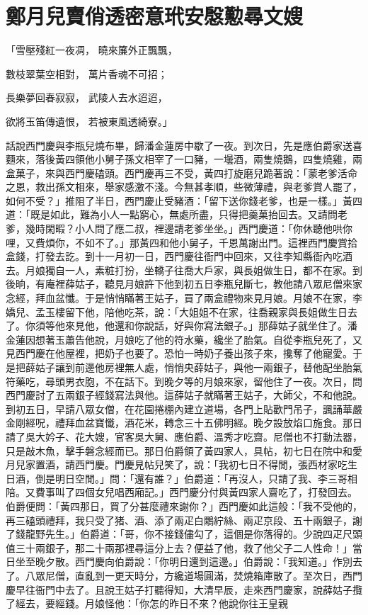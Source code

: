 %

\chapter{鄭月兒賣俏透密意\KG 玳安慇懃尋文嫂}


「雪壓殘紅一夜凋，  曉來簾外正飄飄，

數枝翠葉空相對，  萬片香魂不可招；

長樂夢回春寂寂，  武陵人去水迢迢，

欲將玉笛傳遺恨，  若被東風透綺寮。」

話說西門慶與李瓶兒燒布畢，歸潘金蓮房中歇了一夜。到次日，先是應伯爵家送喜麵來，落後黃四領他小舅子孫文相宰了一口豬，一壜酒，兩隻燒鵝，四隻燒雞，兩盒菓子，來與西門慶磕頭。西門慶再三不受，黃四打旋磨兒跪著說：「蒙老爹活命之恩，救出孫文相來，舉家感激不淺。今無甚孝順，些微薄禮，與老爹賞人罷了，如何不受？」推阻了半日，西門慶止受豬酒：「留下送你錢老爹，也是一樣。」黃四道：「既是如此，難為小人一點窮心，無處所盡，只得把羹菓抬回去。又請問老爹，幾時閑暇？小人問了應二叔，裡邊請老爹坐坐。」西門慶道：「你休聽他哄你哩，又費煩你，不如不了。」那黃四和他小舅子，千恩萬謝出門。這裡西門慶賞拾盒錢，打發去訖。到十一月初一日，西門慶往衙門中回來，又往李知縣衙內吃酒去。月娘獨自一人，素粧打扮，坐轎子往喬大戶家，與長姐做生日，都不在家。到後晌，有庵裡薛姑子，聽見月娘許下他到初五日李瓶兒斷七，教他請八眾尼僧來家念經，拜血盆懺。于是悄悄瞞著王姑子，買了兩盒禮物來見月娘。月娘不在家，李嬌兒、孟玉樓留下他，陪他吃茶，說：「大姐姐不在家，往喬親家與長姐做生日去了。你須等他來見他，他還和你說話，好與你寫法銀子。」那薛姑子就坐住了。潘金蓮因想著玉蕭告他說，月娘吃了他的符水藥，纔坐了胎氣。自從李瓶兒死了，又見西門慶在他屋裡，把奶子也要了。恐怕一時奶子養出孩子來，攙奪了他寵愛。于是把薛姑子讓到前邊他房裡無人處，悄悄央薛姑子，與他一兩銀子，替他配坐胎氣符藥吃，尋頭男衣胞，不在話下。到晚夕等的月娘來家，留他住了一夜。次日，問西門慶討了五兩銀子經錢寫法與他。這薛姑子就瞞著王姑子，大師父，不和他說。到初五日，早請八眾女僧，在花園捲棚內建立道場，各門上貼歡門吊子，諷誦華嚴金剛經呪，禮拜血盆寶懺，酒花米，轉念三十五佛明經。晚夕設放焰口施食。那日請了吳大妗子、花大嫂，官客吳大舅、應伯爵、溫秀才吃齋。尼僧也不打動法器，只是敲木魚，擊手磐念經而已。那日伯爵領了黃四家人，具帖，初七日在院中和愛月兒家置酒，請西門慶。門慶見帖兒笑了，說：「我初七日不得閒，張西材家吃生日酒，倒是明日空閒。」問：「還有誰？」伯爵道：「再沒人，只請了我、李三哥相陪。又費事叫了四個女兒唱西廂記。」西門慶分付與黃四家人齋吃了，打發回去。伯爵便問：「黃四那日，買了分甚麼禮來謝你？」西門慶如此這般：「我不受他的，再三磕頭禮拜，我只受了猪、酒、添了兩疋白鷴紵絲、兩疋京段、五十兩銀子，謝了錢龍野先生。」伯爵道：「哥，你不接錢儘勾了，這個是你落得的。少說四疋尺頭值三十兩銀子，那二十兩那裡尋這分上去？便益了他，救了他父子二人性命！」當日坐至晚夕散。西門慶向伯爵說：「你明日還到這邊。」伯爵說：「我知道。」作別去了。八眾尼僧，直亂到一更天時分，方纔道場圓滿，焚燒箱庫散了。至次日，西門慶早往衙門中去了。且說王姑子打聽得知，大清早辰，走來西門慶家，說薛姑子攬了經去，要經錢。月娘怪他：「你怎的昨日不來？他說你往王皇親